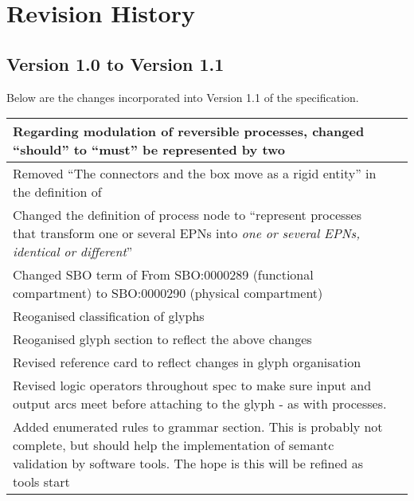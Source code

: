 \chapter{Revision History}

\section{Version 1.0 to Version 1.1}

Below are the changes incorporated into Version 1.1 of the \SBGNPDLone specification.

\begin{center}
\label{tab:revision history 1.1}
\tablelasttail{\hline}
\begin{supertabular}{|p{12cm}|c|}\hline
Regarding modulation of reversible processes, changed ``should'' to ``must'' be represented by two  & \\\hline
Removed ``The connectors and the box move as a rigid entity'' in the definition of  & \\\hline
Changed the definition of process node to ``represent processes that transform one or several EPNs into \emph{one or several EPNs, identical or different}''& \\\hline
Changed SBO term of  From SBO:0000289 (functional compartment) to SBO:0000290 (physical compartment) & \\\hline
Reoganised classification of glyphs & \\\hline
Reoganised glyph section to reflect the above changes & \\\hline
Revised reference card to reflect changes in glyph organisation &
\\\hline
Revised logic operators throughout spec to make sure input and output
arcs meet before attaching to the glyph - as with processes. &
\\\hline
Added enumerated rules to grammar section. This is probably not
complete, but should help the implementation of semantc validation by
software tools. The hope is this will be refined as tools start

\end{supertabular}
\end{center}
